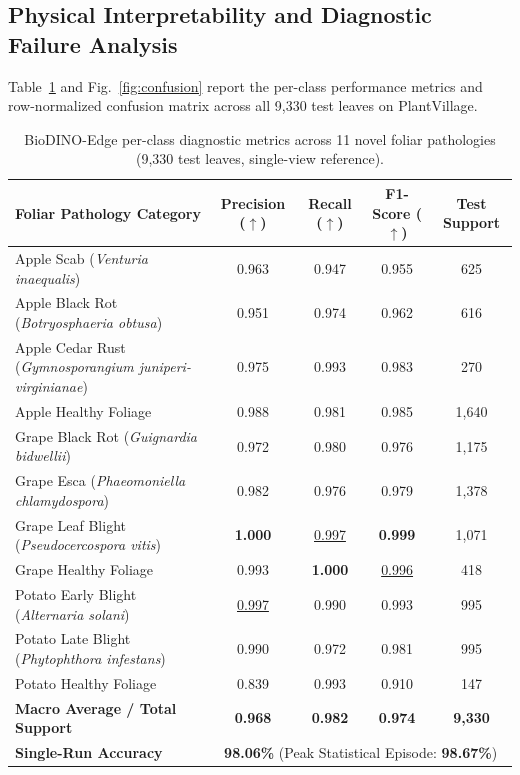 \subsection{Physical Interpretability and Diagnostic Failure Analysis}
\label{sec:per_class}

Table~\ref{tab:per_class} and Fig.~\ref{fig:confusion} report the per-class performance metrics and row-normalized confusion matrix across all 9,330 test leaves on PlantVillage.

\begin{table}[htbp]
\caption{BioDINO-Edge per-class diagnostic metrics across 11 novel foliar pathologies (9,330 test leaves, single-view reference).}
\label{tab:per_class}
\centering

\footnotesize
\setlength{\tabcolsep}{5pt}
\begin{tabularx}{\textwidth}{@{}>{\raggedright\arraybackslash}X *{4}{c}@{}}
\toprule
\textbf{Foliar Pathology Category} & \textbf{Precision ($\uparrow$)} & \textbf{Recall ($\uparrow$)} & \textbf{F1-Score ($\uparrow$)} & \textbf{Test Support} \\
\midrule
Apple Scab (\textit{Venturia inaequalis}) & 0.963 & 0.947 & 0.955 & 625 \\
Apple Black Rot (\textit{Botryosphaeria obtusa}) & 0.951 & 0.974 & 0.962 & 616 \\
Apple Cedar Rust (\textit{Gymnosporangium juniperi-virginianae}) & 0.975 & 0.993 & 0.983 & 270 \\
Apple Healthy Foliage & 0.988 & 0.981 & 0.985 & 1,640 \\
\midrule
Grape Black Rot (\textit{Guignardia bidwellii}) & 0.972 & 0.980 & 0.976 & 1,175 \\
Grape Esca (\textit{Phaeomoniella chlamydospora}) & 0.982 & 0.976 & 0.979 & 1,378 \\
Grape Leaf Blight (\textit{Pseudocercospora vitis}) & \textbf{1.000} & \underline{0.997} & \textbf{0.999} & 1,071 \\
Grape Healthy Foliage & 0.993 & \textbf{1.000} & \underline{0.996} & 418 \\
\midrule
Potato Early Blight (\textit{Alternaria solani}) & \underline{0.997} & 0.990 & 0.993 & 995 \\
Potato Late Blight (\textit{Phytophthora infestans}) & 0.990 & 0.972 & 0.981 & 995 \\
Potato Healthy Foliage & 0.839 & 0.993 & 0.910 & 147 \\
\midrule
\textbf{Macro Average / Total Support} & \textbf{0.968} & \textbf{0.982} & \textbf{0.974} & \textbf{9,330} \\
\textbf{Single-Run Accuracy} & \multicolumn{4}{c}{\textbf{98.06\%} (Peak Statistical Episode: \textbf{98.67\%})} \\
\bottomrule
\end{tabularx}
\end{table}

